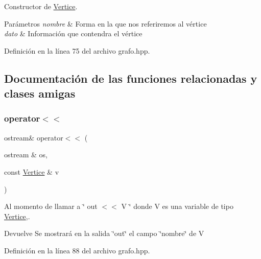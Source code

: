 Constructor de \hyperlink{classVertice}{Vertice}. 


\begin{DoxyParams}{Parámetros}
{\em nombre} & Forma en la que nos referiremos al vértice \\
\hline
{\em dato} & Información que contendra el vértice \\
\hline
\end{DoxyParams}


Definición en la línea 75 del archivo grafo.\+hpp.



\subsection{Documentación de las funciones relacionadas y clases amigas}
\mbox{\label{classVertice_a3c70523eb9e12f80bb42762ac4708819}} 
\subsubsection{\texorpdfstring{operator$<$$<$}{operator<<}\hspace{0.1cm}{\footnotesize\ttfamily [1/2]}}
{\footnotesize\ttfamily ostream\& operator$<$$<$ (\begin{DoxyParamCaption}\item[{ostream \&}]{os,  }\item[{const \hyperlink{classVertice}{Vertice} \&}]{v }\end{DoxyParamCaption})\hspace{0.3cm}{\ttfamily [friend]}}



Al momento de llamar a \char`\"{} out $<$$<$ V \char`\"{} donde V es una variable de tipo \hyperlink{classVertice}{Vertice},. 

\begin{DoxyReturn}{Devuelve}
Se mostrará en la salida \char`\"{}out\char`\"{} el campo \char`\"{}nombre\char`\"{} de V 
\end{DoxyReturn}


Definición en la línea 88 del archivo grafo.\+hpp.

\mbox{\label{classVertice_a11dd2c98c0d8abf3a52c680bc64ccc87}} 
